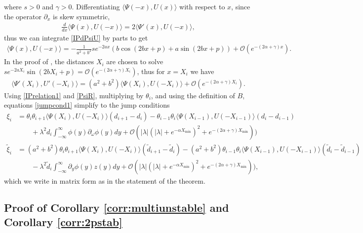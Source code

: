 \documentclass[12pt]{elsarticle}
\begin{document}
where $s > 0$ and $\gamma > 0$. Differentiating $\langle \Psi(-x), U(x) \rangle$ with respect to $x$, since the operator $\partial_x$ is skew symmetric, 
\begin{align*}
\frac{d}{dx} \langle \Psi(x), U(-x) \rangle = 2 \langle \Psi'(x), U(-x) \rangle,
\end{align*}
thus we can integrate \cref{IPdPsiU} by parts to get 
\begin{align*}
\langle \Psi(x), U(-x) \rangle = -\frac{1}{a^2 + b^2} s e^{-2 a x} \left( b \cos(2 b x + p) + a \sin(2 b x + p) \right) + \mathcal{O}(e^{-(2 \alpha + \gamma)x}).
\end{align*}
In the proof of \cite[Theorem 3]{Sandstede1998}, the distances $X_i$ are chosen to solve $s e^{-2 a X_i} \sin(2 b X_i + p) = \mathcal{O}(e^{-(2 \alpha + \gamma)X_i})$, thus for $x = X_i$ we have
\begin{align}\label{IPrelation1}
\langle \Psi'(X_i), U'(-X_i) \rangle = (a^2 + b^2)
\langle \Psi(X_i), U(-X_i) \rangle + \mathcal{O}(e^{-(2 \alpha + \gamma)X_i}).
\end{align}
Using \cref{IPrelation1} and \cref{PsiR}, multiplying by $\theta_i$, and using the definition of $B$, equations \cref{jumpcond1} simplify to the jump conditions
\begin{align*}
\xi_i &= \theta_i \theta_{i+1} \langle \Psi(X_i), U(-X_i) \rangle (d_{i+1} - d_i) 
- \theta_{i-1} \theta_i  \langle \Psi(X_{i-1}), U(-X_{i-1}) \rangle (d_i - d_{i-1}) \\
&\qquad + \lambda^2 d_i \int_{-\infty}^\infty \phi(y) \partial_\omega \phi(y) dy 
+ \mathcal{O}( |\lambda|(|\lambda| + e^{-\alpha X_{\min}})^2 + e^{-(2 \alpha + \gamma)X_{\min} }) )  \\
\tilde{\xi}_i &= (a^2 + b^2) \theta_i \theta_{i+1} \langle \Psi(X_i), U(-X_i) \rangle (\tilde{d}_{i+1} - \tilde{d}_i)
- (a^2 + b^2) \theta_{i-1} \theta_i \langle \Psi(X_{i-1}), U(-X_{i-1}) \rangle (\tilde{d}_i - \tilde{d}_{i-1}) \\
&\qquad- \lambda^2 \tilde{d}_i \int_{-\infty}^\infty \partial_y \phi(y) z(y) dy
+ \mathcal{O}( |\lambda|(|\lambda| + e^{-\alpha X_{\min}})^2 + e^{-(2 \alpha + \gamma)X_{\min} }) ) ,
\end{align*}
which we write in matrix form as in the statement of the theorem.

\subsection{Proof of Corollary \ref{corr:multiunstable} and Corollary \ref{corr:2pstab}}
\end{document}
